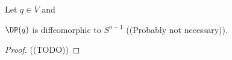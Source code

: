 \begin{lemma}
Let $q\in \overline{V}$ and 
\end{lemma}




\begin{proposition}
    $\DP(q)$ is diffeomorphic to $S^{n-1}$ ((Probably not necessary)).
    \end{proposition}
    \begin{proof}
    ((TODO))
    \end{proof}